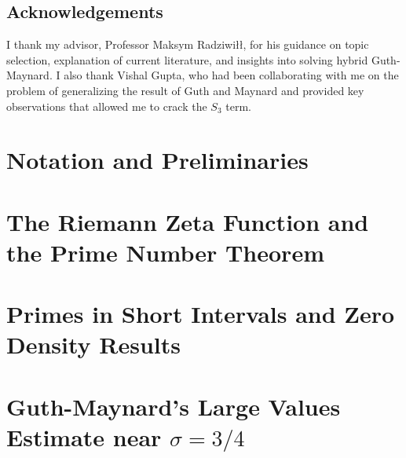 \documentclass[openany,
ngerman,
toc=flat,
toc=chapterentrywithdots,
captions=tableabove,
listof=entryprefix,
listof=leveldown,
fontsize=12pt,
numbers=noenddot]
{book}
\begin{document}
\section*{Acknowledgements}
I thank my advisor, Professor Maksym Radziwi\l\l, for his guidance on topic selection, explanation of current literature, and insights into solving hybrid Guth-Maynard. 
I also thank Vishal Gupta, who had been collaborating with me on the problem of generalizing the result of Guth and Maynard and provided key observations that allowed 
me to crack the $S_3$ term.
\chapter{Notation and Preliminaries}



	\chapter{ The Riemann Zeta Function and the Prime Number Theorem}
	
	
	\chapter{Primes in Short Intervals and Zero Density Results}
	
	
	\chapter{Guth-Maynard's Large Values Estimate near $\sigma = 3/4$}
	
	
	
	
	
	
	
	

	\printbibliography
\end{document}
